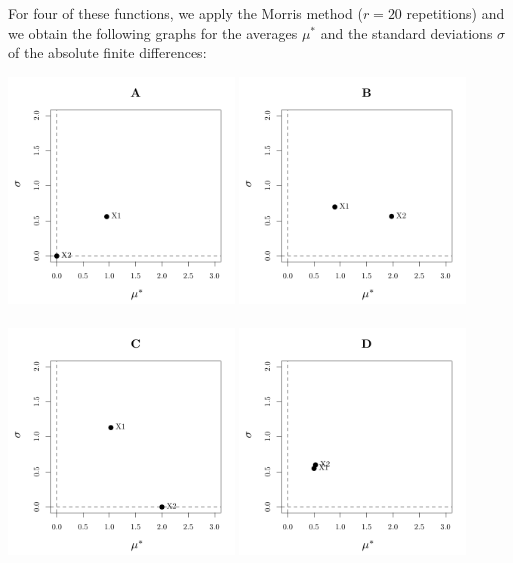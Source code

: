 \documentclass[a4paper,10pt]{article}
\begin{document}
\noindent
For four of these functions, we apply the Morris method ($r = 20$ repetitions) and we obtain the following graphs for the averages $\mu^\ast$ and the standard deviations $\sigma$ of the absolute finite differences: 
\begin{center}
\includegraphics[width=6cm]{figures/exo_morris1.pdf}\qquad
\includegraphics[width=6cm]{figures/exo_morris2.pdf}\\ \ \\
\includegraphics[width=6cm]{figures/exo_morris3.pdf}\qquad
\includegraphics[width=6cm]{figures/exo_morris4.pdf}
\end{center}
\end{document}
